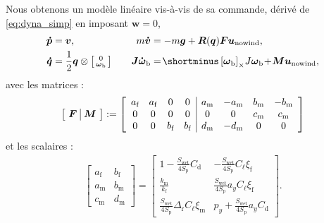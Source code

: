         Nous obtenons un modèle linéaire vis-à-vis de sa commande, dérivé de \eqref{eq:dyna_simp} en imposant  $\boldsymbol{w} = 0$,
        \begin{subequations}\label{eq:withouwind}
        \begin{align}
                \boldsymbol{\dot p} &=  \boldsymbol{v}, \quad &
                m\boldsymbol{\dot v} &= - m\boldsymbol{g} +  \boldsymbol{R}(\boldsymbol{q})\boldsymbol{F}\boldsymbol{u}_{\text{nowind}},\\
                \boldsymbol{\dot q} &= \frac{1}{2}\boldsymbol{q} \otimes \smallmat{0 \\ \boldsymbol{\omega}_{\text{b}}} \quad & \boldsymbol{J} \boldsymbol{\dot \omega}_{\text{b}} &= \! \shortminus \skewsym{\boldsymbol{\omega}_{\text{b}}}\!J\boldsymbol{\omega}_{\text{b}} \! + \! \boldsymbol{M}\boldsymbol{u}_{\text{nowind}},
        \end{align}
        \end{subequations}
        avec les matrices :
        \begin{align}
            \label{eq:FandM}
            \left[ \begin{array}{c|c}\!\boldsymbol{F}\!&\!\boldsymbol{M}\!\end{array} \right] := \left[ \begin{array}{cccc | cccc} a_{\text{f}} & a_{\text{f}} & 0 & 0 & a_{\text{m}} & -a_{\text{m}} & b_{\text{m}} & -b_{\text{m}} \\  0 & 0 & 0 & 0 & 0 & 0 & c_{\text{m}} & c_{\text{m}} \\ 0 & 0 & b_{\text{f}} & b_{\text{f}} & d_{\text{m}} & -d_{\text{m}} & 0 & 0 \end{array} \right]
        \end{align}
        et les scalaires :
            \begin{align*}
                \left[\!\! \begin{array}{c|c} 
                a_{\text{f}} & b_{\text{f}} \\ \hline
                a_{\text{m}} & b_{\text{m}} \\ \hline
                c_{\text{m}} & d_{\text{m}}
                \end{array} \!\!\right] \!=\!
                \left[\begin{array}{c|c}
                1-\frac{S_{\text{wet}}}{4S_{\text{p}}} C_{\text{d}}  & -\frac{S_{\text{wet}}}{4S_{\text{p}}}C_{\ell}\xi_{\text{f}} \\ \hline
                \frac{k_{\text{m}} }{k_{\text{f}}}  &   \! \frac{S_{\text{wet}}}{4S_{\text{p}}}a_{y}C_{\ell}\xi_{\text{f}} \!\\ \hline
                \!\! \frac{S_{\text{wet}}}{4S_{\text{p}}} \Delta_{\text{r}}C_{\ell}\xi_{\text{m}} \!\! & 
                p_{y}+\frac{S_{\text{wet}}}{4S_{\text{p}}} a_{y} C_{\text{d}}
                \end{array}\right].
            \end{align*}


